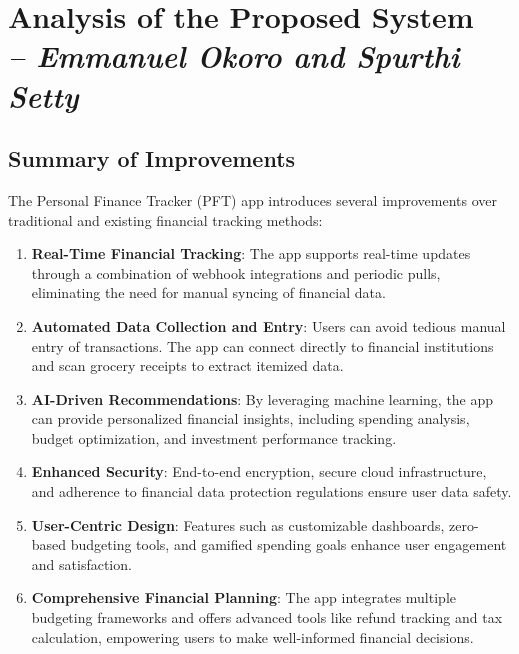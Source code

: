 \chapter{Analysis of the Proposed System \\
\small{\textit{-- Emmanuel Okoro and Spurthi Setty}}
\label{Chapter::Analysis of the Proposed System}}


\section{Summary of Improvements}
The Personal Finance Tracker (PFT) app introduces several improvements over traditional and existing financial tracking methods:

\begin{enumerate}
    \item \textbf{Real-Time Financial Tracking}: The app supports real-time updates through a combination of webhook integrations and periodic pulls, eliminating the need for manual syncing of financial data.

    \item \textbf{Automated Data Collection and Entry}: Users can avoid tedious manual entry of transactions. The app can connect directly to financial institutions and scan grocery receipts to extract itemized data.

    \item \textbf{AI-Driven Recommendations}: By leveraging machine learning, the app can provide personalized financial insights, including spending analysis, budget optimization, and investment performance tracking.

    \item \textbf{Enhanced Security}: End-to-end encryption, secure cloud infrastructure, and adherence to financial data protection regulations ensure user data safety.

    \item \textbf{User-Centric Design}: Features such as customizable dashboards, zero-based budgeting tools, and gamified spending goals enhance user engagement and satisfaction.

    \item \textbf{Comprehensive Financial Planning}: The app integrates multiple budgeting frameworks and offers advanced tools like refund tracking and tax calculation, empowering users to make well-informed financial decisions.
\end{enumerate}

